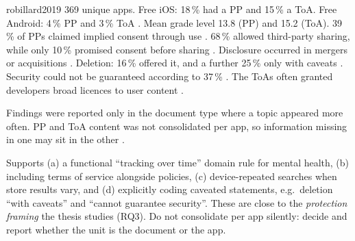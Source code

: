 \begin{papercard}{robillard2019}
 369 unique apps. Free iOS: 18\,\% had a PP and 15\,\% a ToA. Free Android: 4\,\% PP and 3\,\% ToA . Mean grade level 13.8 (PP) and 15.2 (ToA). 39\,\% of PPs claimed implied consent through use . 68\,\% allowed third-party sharing, while only 10\,\% promised consent before sharing . Disclosure occurred in mergers or acquisitions . Deletion: 16\,\% offered it, and a further 25\,\% only with caveats . Security could not be guaranteed according to 37\,\% . The ToAs often granted developers broad licences to user content .

 Findings were reported only in the document type where a topic appeared more often. PP and ToA content was not consolidated per app, so information missing in one may sit in the other .

 Supports (a) a functional ``tracking over time'' domain rule for mental health, (b) including terms of service alongside policies, (c) device-repeated searches when store results vary, and (d) explicitly coding caveated statements, e.g.\ deletion ``with caveats'' and ``cannot guarantee security''. These are close to the \emph{protection framing} the thesis studies (RQ3). Do not consolidate per app silently: decide and report whether the unit is the document or the app.
\end{papercard}

